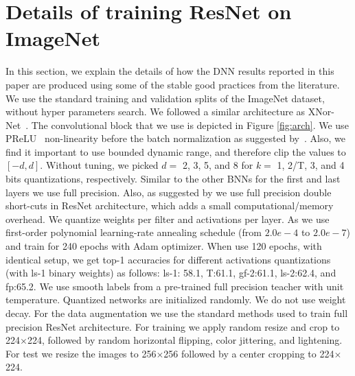 \documentclass[10pt,twocolumn,letterpaper]{article}
\begin{document}
\section{Details of training ResNet on ImageNet} \label{sec:training_details}
In this section, we explain the details of how the DNN results reported in this paper are produced using some of the stable good practices from the literature. We use the standard training and validation splits of the ImageNet dataset, without hyper parameters search. We followed a similar architecture as XNor-Net~\cite{rastegari2016xnor}. The convolutional block that we use is depicted in Figure \ref{fig:arch}. We use PReLU~\cite{he2015delving,bulat2019improved} non-linearity before the batch normalization as suggested by~\cite{rastegari2016xnor}. Also, we find it important to use bounded dynamic range, and therefore clip the values to $[-d, d]$.
Without tuning, we picked $d=$ 2, 3, 5, and 8 for $k=$ 1, 2/T, 3, and 4 bits quantizations, respectively. Similar to the other BNNs for the first and last layers we use full precision. Also, as suggested by \cite{liu2018bi} we use full precision {double short-cuts} in ResNet architecture, which adds a small computational/memory overhead. We quantize weights per filter and activations per layer.
As \cite{cai2017deep} we use first-order polynomial learning-rate annealing schedule (from $2.0e-4$ to $2.0e-7$) and train for 240 epochs with Adam optimizer. When use 120 epochs, with identical setup, we get top-1 accuracies for different activations quantizations (with ls-1 binary weights) as follows: ls-1: 58.1, T:61.1, gf-2:61.1, ls-2:62.4, and fp:65.2. We use smooth labels from a pre-trained full precision teacher \cite{hinton2015distilling} with unit temperature. Quantized networks are initialized randomly.
We do not use weight decay. For the data augmentation we use the standard methods used to train full precision ResNet architecture. For training we apply random resize and crop to 224$\times$224, followed by random horizontal flipping, color jittering, and lightening. For test we resize the images to 256$\times$256 followed by a center cropping to 224$\times$224.

\newpage
{\small


}
\end{document}
